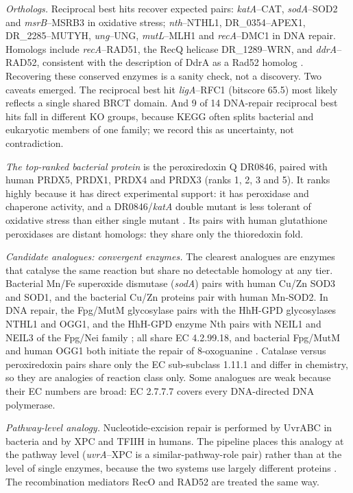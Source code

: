 \documentclass[conference]{IEEEtran}
\newcommand{\gene}[1]{\textit{#1}}
\begin{document}
\emph{Orthologs.} Reciprocal best hits recover expected pairs: \gene{katA}--CAT, \gene{sodA}--SOD2
and \gene{msrB}--MSRB3 in oxidative stress; \gene{nth}--NTHL1, DR\_0354--APEX1, DR\_2285--MUTYH,
\gene{ung}--UNG, \gene{mutL}--MLH1 and \gene{recA}--DMC1 in DNA repair. Homologs include
\gene{recA}--RAD51, the RecQ helicase DR\_1289--WRN, and \gene{ddrA}--RAD52, consistent with the
description of DdrA as a Rad52 homolog \cite{harris2004}. Recovering these conserved enzymes is a
sanity check, not a discovery. Two caveats emerged. The reciprocal best hit \gene{ligA}--RFC1
(bitscore 65.5) most likely reflects a single shared BRCT domain. And 9 of 14 DNA-repair reciprocal
best hits fall in different KO groups, because KEGG often splits bacterial and eukaryotic members of
one family; we record this as uncertainty, not contradiction.

\emph{The top-ranked bacterial protein} is the peroxiredoxin Q DR0846, paired with human PRDX5,
PRDX1, PRDX4 and PRDX3 (ranks 1, 2, 3 and 5). It ranks highly because it has direct experimental
support: it has peroxidase and chaperone activity, and a DR0846/\gene{katA} double mutant is less tolerant
of oxidative stress than either single mutant \cite{cho2018}. Its pairs with human glutathione
peroxidases are distant homologs: they share only the thioredoxin fold.

\emph{Candidate analogues: convergent enzymes.} The clearest analogues are enzymes that catalyse
the same reaction but share no detectable homology at any tier. Bacterial Mn/Fe superoxide
dismutase (\gene{sodA}) pairs with human Cu/Zn SOD3 and SOD1, and the bacterial Cu/Zn proteins pair with human Mn-SOD2. In DNA
repair, the Fpg/MutM glycosylase pairs with the HhH-GPD glycosylases NTHL1 and OGG1, and the
HhH-GPD enzyme Nth pairs with NEIL1 and NEIL3 of the Fpg/Nei family \cite{ide2001}; all share
EC 4.2.99.18, and bacterial Fpg/MutM and human OGG1 both initiate the repair of 8-oxoguanine
\cite{boiteux2017}. Catalase versus peroxiredoxin pairs share
only the EC sub-subclass 1.11.1 and differ in chemistry, so they are analogies of reaction class
only. Some analogues are weak because their EC numbers are broad: EC 2.7.7.7 covers every
DNA-directed DNA polymerase.

\emph{Pathway-level analogy.} Nucleotide-excision repair is performed by UvrABC in bacteria and by
XPC and TFIIH in humans. The pipeline places this analogy at the pathway level
(\gene{uvrA}--XPC is a similar-pathway-role pair) rather than at the level of single enzymes,
because the two systems use largely different proteins \cite{hoeijmakers1991}. The recombination
mediators RecO and
RAD52 are treated the same way.
\end{document}

